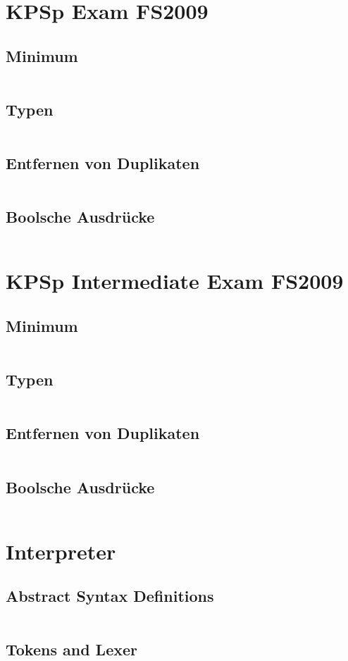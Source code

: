 \documentclass[a4paper,9pt,twoside]{book}
\newcommand{\hsfile}[1]{\inputminted[breaklines]{haskell}{../haskell/#1.hs}}
\begin{document}
\chapter{KPSp Exam FS2009}
\section{Minimum}
\hsfile{exami2009/problem_1}
\section{Typen}
\hsfile{exami2009/problem_2}
\section{Entfernen von Duplikaten}
\hsfile{exami2009/problem_3}
\section{Boolsche Ausdrücke}
\hsfile{exami2009/problem_4}

\chapter{KPSp Intermediate Exam FS2009}
\section{Minimum}
\hsfile{exami2009/problem_1}
\section{Typen}
\hsfile{exami2009/problem_2}
\section{Entfernen von Duplikaten}
\hsfile{exami2009/problem_3}
\section{Boolsche Ausdrücke}
\hsfile{exami2009/problem_4}

\chapter{Interpreter}
\section{Abstract Syntax Definitions}
\hsfile{interpreter/AbsSyn}
\section{Tokens and Lexer}
\hsfile{interpreter/Scanner}
\end{document}

